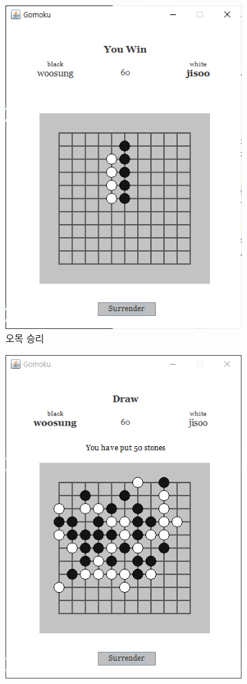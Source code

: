 \documentclass[a4paper, 10pt]{article}
\begin{document}
\begin{figure}[h]
\begin{subfigure}{.3\textwidth}
    \includegraphics[width=.9\linewidth]{resource/win}
    \caption{오목 승리}
    \label{fig:win}
  \end{subfigure}
  \begin{subfigure}{.3\textwidth}
    \centering
    \includegraphics[width=.9\linewidth]{resource/draw}

\end{subfigure}
\end{figure}
\end{document}
